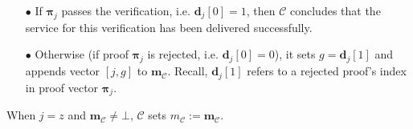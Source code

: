 \begin{enumerate}
\begin{enumerate}
\begin{itemize}
\item[$\bullet$] If $ {\bm{\pi}}_{\scriptscriptstyle j}$ passes the verification, i.e. $ {\bm{d}}_{\scriptscriptstyle j}[0]=1$, then $\mathcal C$  concludes that the service for this verification has been delivered successfully.  


\item[$\bullet$] Otherwise (if proof $ {\bm{\pi}}_{\scriptscriptstyle j}$ is rejected, i.e. $ {\bm{d}}_{\scriptscriptstyle j}[0]=0$),  it sets $g= {\bm{d}}_{\scriptscriptstyle j}[1]$ and appends vector $[j,g]$  to $ {\bm{m}}_{\scriptscriptstyle\mathcal{C}}$. Recall, $ {\bm{d}}_{\scriptscriptstyle j}[1]$ refers to a rejected proof's index in proof vector $ {\bm{\pi}}_{\scriptscriptstyle j}$. 

\end{itemize}
\end{enumerate}
When $j=z$  and $\bm{m}_{\scriptscriptstyle\mathcal{C}}\neq\bot$, $\mathcal C$ sets    ${m}_{\scriptscriptstyle\mathcal C}:=\bm{m}_{\scriptscriptstyle\mathcal{C}}$.




 

\end{enumerate}
